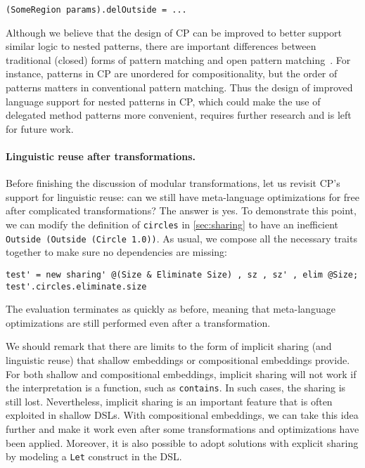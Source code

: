 \begin{lstlisting}
(SomeRegion params).delOutside = ...
\end{lstlisting}

\noindent
Although we believe that the design of CP can be improved to better support
similar logic to nested patterns, there are important differences between
traditional (closed) forms of pattern matching and open pattern
matching~\citep{zhang2020castor}. For instance, patterns in CP are unordered for
compositionality, but the order of patterns matters in conventional pattern
matching. Thus the design of improved language support for nested patterns in
CP, which could make the use of delegated method patterns more convenient,
requires further research and is left for future work.

\paragraph{Linguistic reuse after transformations.}
Before finishing the discussion of modular transformations, let us revisit CP's
support for linguistic reuse: can we still have meta-language optimizations for
free after complicated transformations? The answer is yes. To demonstrate this
point, we can modify the definition of \lstinline{circles} in
\autoref{sec:sharing} to have an inefficient
\lstinline{Outside (Outside (Circle 1.0))}. As usual, we compose all the
necessary traits together to make sure no dependencies are missing:

\begin{lstlisting}
test' = new sharing' @(Size & Eliminate Size) , sz , sz' , elim @Size;
test'.circles.eliminate.size
\end{lstlisting}

\noindent
The evaluation terminates as quickly as before, meaning that meta-language
optimizations are still performed even after a transformation.

We should remark that there are limits to the form of implicit sharing (and
linguistic reuse) that shallow embeddings or compositional embeddings provide.
For both shallow and compositional embeddings, implicit sharing will not work if
the interpretation is a function, such as \lstinline{contains}. In such cases,
the sharing is still lost. Nevertheless, implicit sharing is an important
feature that is often exploited in shallow DSLs. With compositional embeddings,
we can take this idea further and make it work even after some transformations
and optimizations have been applied. Moreover, it is also possible to adopt
solutions with explicit sharing by modeling a \lstinline{Let} construct in the
DSL.

